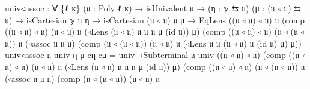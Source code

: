 \documentclass[
  11pt,
  oneside,
  article]{memoir}
\newenvironment{Shaded}{}{}
\newcommand{\NormalTok}[1]{#1}
\newcommand{\OtherTok}[1]{\textcolor[rgb]{0.00,0.44,0.13}{#1}}
\theoremstyle{definition}
\theoremstyle{plain}
\newcommand{\0}{\textsf{0}}
\newcommand{\1}{\tn{\textsf{1}}}
\begin{document}
\begin{Shaded}
\begin{Highlighting}[]
\NormalTok{univ◃assoc }\OtherTok{:} \OtherTok{∀} \OtherTok{\{}\NormalTok{ℓ κ}\OtherTok{\}} \OtherTok{(}\NormalTok{𝔲 }\OtherTok{:}\NormalTok{ Poly ℓ κ}\OtherTok{)} \OtherTok{→}\NormalTok{ isUnivalent 𝔲}
             \OtherTok{→} \OtherTok{(}\NormalTok{η }\OtherTok{:}\NormalTok{ 𝕪 ⇆ 𝔲}\OtherTok{)} \OtherTok{(}\NormalTok{μ }\OtherTok{:} \OtherTok{(}\NormalTok{𝔲 ◃ 𝔲}\OtherTok{)}\NormalTok{ ⇆ 𝔲}\OtherTok{)}
             \OtherTok{→}\NormalTok{ isCartesian 𝕪 𝔲 η }\OtherTok{→}\NormalTok{ isCartesian }\OtherTok{(}\NormalTok{𝔲 ◃ 𝔲}\OtherTok{)}\NormalTok{ 𝔲 μ}
             \OtherTok{→}\NormalTok{ EqLens }\OtherTok{((}\NormalTok{𝔲 ◃ 𝔲}\OtherTok{)}\NormalTok{ ◃ 𝔲}\OtherTok{)}\NormalTok{ 𝔲}
                      \OtherTok{(}\NormalTok{comp }\OtherTok{((}\NormalTok{𝔲 ◃ 𝔲}\OtherTok{)}\NormalTok{ ◃ 𝔲}\OtherTok{)} \OtherTok{(}\NormalTok{𝔲 ◃ 𝔲}\OtherTok{)}\NormalTok{ 𝔲}
                            \OtherTok{(}\NormalTok{◃Lens }\OtherTok{(}\NormalTok{𝔲 ◃ 𝔲}\OtherTok{)}\NormalTok{ 𝔲 𝔲 𝔲 μ }\OtherTok{(}\NormalTok{id 𝔲}\OtherTok{))}\NormalTok{ μ}\OtherTok{)}
                      \OtherTok{(}\NormalTok{comp }\OtherTok{((}\NormalTok{𝔲 ◃ 𝔲}\OtherTok{)}\NormalTok{ ◃ 𝔲}\OtherTok{)} \OtherTok{(}\NormalTok{𝔲 ◃ }\OtherTok{(}\NormalTok{𝔲 ◃ 𝔲}\OtherTok{))}\NormalTok{ 𝔲}
                            \OtherTok{(}\NormalTok{◃assoc 𝔲 𝔲 𝔲}\OtherTok{)}
                            \OtherTok{(}\NormalTok{comp }\OtherTok{(}\NormalTok{𝔲 ◃ }\OtherTok{(}\NormalTok{𝔲 ◃ 𝔲}\OtherTok{))} \OtherTok{(}\NormalTok{𝔲 ◃ 𝔲}\OtherTok{)}\NormalTok{ 𝔲}
                                  \OtherTok{(}\NormalTok{◃Lens 𝔲 𝔲 }\OtherTok{(}\NormalTok{𝔲 ◃ 𝔲}\OtherTok{)}\NormalTok{ 𝔲 }
                                         \OtherTok{(}\NormalTok{id 𝔲}\OtherTok{)}\NormalTok{ μ}\OtherTok{)}\NormalTok{ μ}\OtherTok{))}
\NormalTok{univ◃assoc 𝔲 univ η μ cη cμ }\OtherTok{=}
\NormalTok{    univ→Subterminal }
\NormalTok{        𝔲 univ }\OtherTok{((}\NormalTok{𝔲 ◃ 𝔲}\OtherTok{)}\NormalTok{ ◃ 𝔲}\OtherTok{)} 
        \OtherTok{(}\NormalTok{comp }\OtherTok{((}\NormalTok{𝔲 ◃ 𝔲}\OtherTok{)}\NormalTok{ ◃ 𝔲}\OtherTok{)} \OtherTok{(}\NormalTok{𝔲 ◃ 𝔲}\OtherTok{)}\NormalTok{ 𝔲 }
              \OtherTok{(}\NormalTok{◃Lens }\OtherTok{(}\NormalTok{𝔲 ◃ 𝔲}\OtherTok{)}\NormalTok{ 𝔲 𝔲 𝔲 μ }\OtherTok{(}\NormalTok{id 𝔲}\OtherTok{))}\NormalTok{ μ}\OtherTok{)} 
        \OtherTok{(}\NormalTok{comp }\OtherTok{((}\NormalTok{𝔲 ◃ 𝔲}\OtherTok{)}\NormalTok{ ◃ 𝔲}\OtherTok{)} \OtherTok{(}\NormalTok{𝔲 ◃ }\OtherTok{(}\NormalTok{𝔲 ◃ 𝔲}\OtherTok{))}\NormalTok{ 𝔲 }
              \OtherTok{(}\NormalTok{◃assoc 𝔲 𝔲 𝔲}\OtherTok{)} 
              \OtherTok{(}\NormalTok{comp }\OtherTok{(}\NormalTok{𝔲 ◃ }\OtherTok{(}\NormalTok{𝔲 ◃ 𝔲}\OtherTok{))} \OtherTok{(}\NormalTok{𝔲 ◃ 𝔲}\OtherTok{)}\NormalTok{ 𝔲 }

\end{Highlighting}
\end{Shaded}
\end{document}
